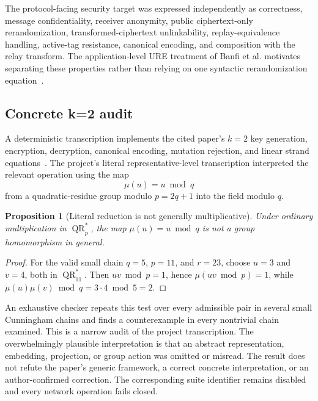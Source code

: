 \documentclass[11pt,oneside]{article}
\newtheorem{proposition}{Proposition}
\begin{document}
The protocol-facing security target was expressed independently as correctness, message confidentiality, receiver anonymity, public ciphertext-only rerandomization, transformed-ciphertext unlinkability, replay-equivalence handling, active-tag resistance, canonical encoding, and composition with the relay transform. The application-level URE treatment of Banfi et al. motivates separating these properties rather than relying on one syntactic rerandomization equation~\cite{ure2023}.

\subsection{Concrete k=2 audit}

A deterministic transcription implements the cited paper's $k=2$ key generation, encryption, decryption, canonical encoding, mutation rejection, and linear strand equations~\cite{anonrcca2021}. The project's literal representative-level transcription interpreted the relevant operation using the map
\begin{equation}
\mu(u)=u\bmod q
\end{equation}
from a quadratic-residue group modulo $p=2q+1$ into the field modulo $q$.

\begin{proposition}[Literal reduction is not generally multiplicative]
Under ordinary multiplication in $\operatorname{QR}^{*}_{p}$, the map $\mu(u)=u\bmod q$ is not a group homomorphism in general.
\end{proposition}

\begin{proof}
For the valid small chain $q=5$, $p=11$, and $r=23$, choose $u=3$ and $v=4$, both in $\operatorname{QR}^{*}_{11}$. Then $uv\bmod p=1$, hence $\mu(uv\bmod p)=1$, while
$\mu(u)\mu(v)\bmod q=3\cdot4\bmod5=2$.
\end{proof}

An exhaustive checker repeats this test over every admissible pair in several small Cunningham chains and finds a counterexample in every nontrivial chain examined. This is a narrow audit of the project transcription. The overwhelmingly plausible interpretation is that an abstract representation, embedding, projection, or group action was omitted or misread. The result does not refute the paper's generic framework, a correct concrete interpretation, or an author-confirmed correction. The corresponding suite identifier remains disabled and every network operation fails closed.
\end{document}
